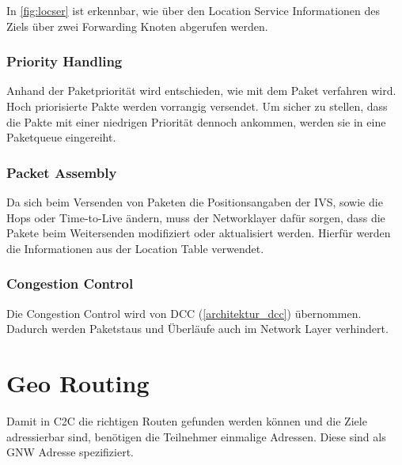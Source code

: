 In \autoref{fig:locser} ist erkennbar, wie über den Location Service Informationen des Ziels über zwei Forwarding Knoten abgerufen werden. 

\subsubsection{Priority Handling}
Anhand der Paketpriorität wird entschieden, wie mit dem Paket verfahren wird. Hoch priorisierte Pakte werden vorrangig versendet. Um sicher zu stellen, dass die Pakte mit einer niedrigen Priorität dennoch ankommen, werden sie in eine Paketqueue eingereiht. 


\subsubsection{Packet Assembly}
Da sich beim Versenden von Paketen die Positionsangaben der \ac{IVS}, sowie die Hops oder Time-to-Live ändern, muss der Networklayer dafür sorgen, dass die Pakete beim Weitersenden modifiziert oder aktualisiert werden. Hierfür werden die Informationen aus der Location Table verwendet.

\subsubsection{Congestion Control}
Die Congestion Control wird von \ac{DCC} (\autoref{architektur_dcc}) übernommen. Dadurch werden Paketstaus und Überläufe auch im Network Layer verhindert.

\section{Geo Routing\label{sec:georouting}}
Damit in \ac{C2C} die richtigen Routen gefunden werden können und die Ziele adressierbar sind, benötigen die Teilnehmer einmalige Adressen. Diese sind als \acl{GNW} Adresse spezifiziert. 

